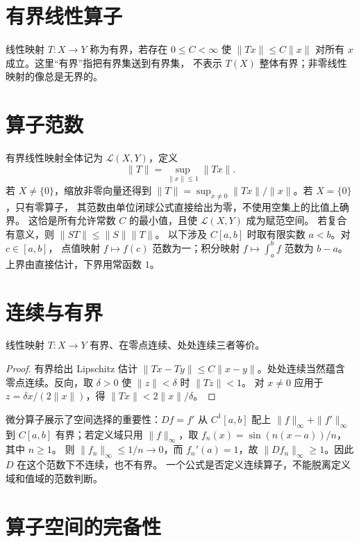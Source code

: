 \section{有界线性算子}

线性映射 \(T:X\to Y\) 称为有界，若存在 \(0\le C<\infty\) 使
\(\|Tx\|\le C\|x\|\) 对所有 \(x\) 成立。这里“有界”指把有界集送到有界集，
不表示 \(T(X)\) 整体有界；非零线性映射的像总是无界的。

\section{算子范数}

有界线性映射全体记为 \(\mathcal L(X,Y)\)，定义
\[
 \|T\|=\sup_{\|x\|\le1}\|Tx\|.
\]
若 \(X\ne\{0\}\)，缩放非零向量还得到
\(\|T\|=\sup_{x\ne0}\|Tx\|/\|x\|\)。若 \(X=\{0\}\)，只有零算子，
其范数由单位闭球公式直接给出为零，不使用空集上的比值上确界。
这恰是所有允许常数 \(C\) 的最小值，且使 \(\mathcal L(X,Y)\) 成为赋范空间。
若复合有意义，则 \(\|ST\|\le\|S\|\|T\|\)。
以下涉及 \(C[a,b]\) 时取有限实数 \(a<b\)。对 \(c\in[a,b]\)，
点值映射 \(f\mapsto f(c)\) 范数为一；积分映射
\(f\mapsto\int_a^bf\) 范数为 \(b-a\)。上界由直接估计，下界用常函数 \(1\)。

\section{连续与有界}

\begin{theorem}\label{thm:linear-continuous-bounded}
线性映射 \(T:X\to Y\) 有界、在零点连续、处处连续三者等价。
\end{theorem}
\begin{proof}
有界给出 Lipschitz 估计 \(\|Tx-Ty\|\le C\|x-y\|\)。处处连续当然蕴含
零点连续。反向，取 \(\delta>0\) 使 \(\|z\|<\delta\) 时 \(\|Tz\|<1\)。
对 \(x\ne0\) 应用于 \(z=\delta x/(2\|x\|)\)，得
\(\|Tx\|<2\|x\|/\delta\)。
\end{proof}

微分算子展示了空间选择的重要性：\(Df=f'\) 从 \(C^1[a,b]\) 配上
\(\|f\|_\infty+\|f'\|_\infty\) 到 \(C[a,b]\) 有界；若定义域只用
\(\|f\|_\infty\)，取 \(f_n(x)=\sin(n(x-a))/n\)，其中 \(n\ge1\)。
则 \(\|f_n\|_\infty\le1/n\to0\)，而 \(f_n'(a)=1\)，故
\(\|Df_n\|_\infty\ge1\)。因此 \(D\) 在这个范数下不连续，也不有界。
一个公式是否定义连续算子，不能脱离定义域和值域的范数判断。

\section{算子空间的完备性}

